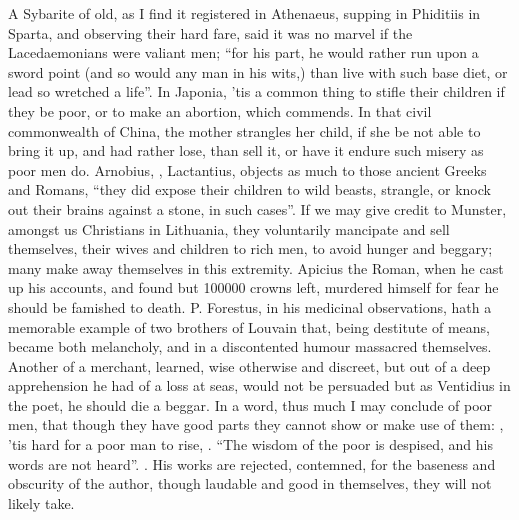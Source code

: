 A Sybarite of old, as I find it registered in Athenaeus,
supping in Phiditiis in Sparta, and observing their hard fare, said it was no
marvel if the Lacedaemonians were valiant men; \enquote{for his part, he would rather
run upon a sword point (and so would any man in his wits,) than live with such
base diet, or lead so wretched a life}. In Japonia, 'tis a
common thing to stifle their children if they be poor, or to make an abortion,
which \Aristotle{} commends. In that civil commonwealth of China,
the mother strangles her child, if she be not able to
bring it up, and had rather lose, than sell it, or have it endure such misery
as poor men do. Arnobius, ,
Lactantius,  objects
as much to those ancient Greeks and Romans, \enquote{they did expose their children to
wild beasts, strangle, or knock out their brains against a stone, in such
cases}. If we may give credit to Munster, amongst us
Christians in Lithuania, they voluntarily mancipate and sell themselves, their
wives and children to rich men, to avoid hunger and beggary;
many make away themselves in this extremity. Apicius the
Roman, when he cast up his accounts, and found but 100\thinspace{}000 crowns
left, murdered himself for fear he should be famished to death. P. Forestus, in
his medicinal observations, hath a memorable example of two brothers of Louvain
that, being destitute of means, became both melancholy, and in a discontented
humour massacred themselves. Another of a merchant, learned, wise otherwise and
discreet, but out of a deep apprehension he had of a loss at seas, would not be
persuaded but as Ventidius in the poet, he should die a
beggar. In a word, thus much I may conclude of poor men, that though they have
good parts they cannot show or make use of them:
, 'tis hard for
a poor man to rise, . \enquote{The wisdom of the
poor is despised, and his words are not heard}. .
His works are rejected, contemned, for the baseness and obscurity of the
author, though laudable and good in themselves, they will not likely take.


